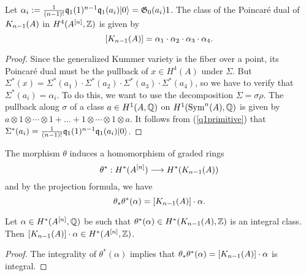 \begin{proposition}
Let $\alpha_i := \frac{1}{(n-1)!}\kq_{1}(1)^{n-1}\kq_1(a_i)\vac = \G_0(a_i)1$. The class of the Poincar\'e dual of $\kum{A}{n-1}$ in $H^4(A\hilb{n},\Z)$ is given by
$$
[\kum{A}{n-1}]=\alpha_1\cdot\alpha_2\cdot\alpha_3\cdot\alpha_4.
$$ 
\end{proposition}
\begin{proof}
Since the generalized Kummer variety is the fiber over a point, its Poincar\'e dual must be the pullback of $x\in H^4(A)$ under $\Sigma$. But $\Sigma^* (x) = \Sigma^*(a_1)\cdot \Sigma^*(a_2)\cdot \Sigma^*(a_3)\cdot \Sigma^*(a_4)$, so we have to verify that $\Sigma^* (a_i) = \alpha_i$. To do this, we want to use the decomposition $\Sigma = \sigma\rho$.
The pullback along $\sigma$ of a class $a\in H^1(A,\Q)$ on $H^1(\Sym^n(A),\Q)$ 
is given by $a\otimes 1\otimes \cdots\otimes 1 + \ldots + 1\otimes \cdots\otimes 1\otimes a$. It follows from (\ref{q1primitive}) that $\Sigma^* (a_i) = \frac{1}{(n-1)!}\kq_{1}(1)^{n-1}\kq_1(a_i)\vac $.
\end{proof}
The morphism $\theta$ induces a homomorphism of graded rings
\begin{equation}
\theta^* :H^*(A\hilb{n})\longrightarrow H^*(\kum{A}{n-1})
\end{equation}
and by the projection formula, we have
\begin{equation}
\theta_*\theta^*(\alpha)  = [\kum{A}{n-1}]\cdot\alpha.
\end{equation}
\begin{lemma}\label{IntegralityCheck}
Let $\alpha\in H^*(A\hilb{n},\Q)$ be such that $\theta^*(\alpha)\in  H^*(\kum{A}{n-1},\Z)$ is an integral class. Then $[\kum{A}{n-1}]\cdot\alpha \in H^*(A\hilb{n},\Z)$. 
\end{lemma}
\begin{proof}
The integrality of $\theta^*(\alpha)$ implies that $\theta_*\theta^*(\alpha) = [\kum{A}{n-1}]\cdot\alpha$ is integral.
\end{proof}

